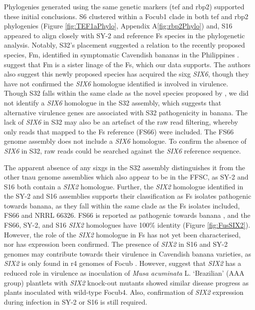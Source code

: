 Phylogenies generated using the same genetic markers (\ac{tef} and \ac{rbp2}) supported these initial conclusions. S6 clustered within a \ac{Focub1} clade in both \acs{tef} and \ac{rbp2} phylogenies (Figure \ref{fig:TEF1aPhylo}, Appendix A\ref{fig:rbp2Phylo}) and, S16 appeared to align closely with SY-2 and reference \ac{Fs} species in the phylogenetic analysis. Notably, S32's placement suggested a relation to the recently proposed species, \acf{Fm}, identified in symptomatic Cavendish bananas in the Philippines \parencite{Nozawa2023}. \textcite{Nozawa2023} suggest that \ac{Fm} is a sister linage of the \ac{Fs}, which our data supports. The authors also suggest this newly proposed species has acquired the \ac{sixg} \textit{SIX6}, though they have not confirmed the \textit{SIX6} homologue identified is involved in virulence. Though S32 falls within the same clade as the novel species proposed by \textcite{Nozawa2023}, we did not identify a \textit{SIX6} homologue in the S32 assembly, which suggests that alternative virulence genes are associated with S32 pathogenicity in banana. The lack of \textit{SIX6} in S32 may also be an artefact of the raw read filtering, whereby only reads that mapped to the \ac{Fs} reference (FS66) were included. The FS66 genome assembly does not include a \textit{SIX6} homologue. To confirm the absence of \textit{SIX6} in S32, raw reads could be searched against the \textit{SIX6} reference sequence. 

The apparent absence of any \acp{sixg} in the S32 assembly distinguishes it from the other \ac{tnau} genome assemblies which also appear to be in the \ac{FFSC}, as SY-2 and S16 both contain a \textit{SIX2} homologue. Further, the \textit{SIX2} homologue identified in the SY-2 and S16 assemblies supports their classification as \ac{Fs} isolates pathogenic towards banana, as they fall within the same clade as the \ac{Fs} isolates included, FS66 and NRRL 66326. FS66 is reported as pathogenic towards banana \parencite{Cui2021}, and the FS66, SY-2, and S16 \textit{SIX2} homologues have 100\% identity (Figure \ref{fig:FusSIX2}). However, the role of the \textit{SIX2} homologue in \ac{Fs} has not yet been characterised, nor has expression been confirmed. The presence of \textit{SIX2} in S16 and SY-2 genomes may contribute towards their virulence in Cavendish banana varieties, as \textit{SIX2} is only found in \ac{r4} genomes of \ac{Focub} \parencite{Czislowski2018}. However, \textcite{An2019} suggest that \textit{SIX2} has a reduced role in virulence as inoculation of \textit{Musa acuminata} L. ‘Brazilian’ (AAA group) plantlets with \textit{SIX2} knock-out mutants showed similar disease progress as plants inoculated with wild-type \ac{Focub4}. Also, confirmation of \textit{SIX2} expression during infection in SY-2 or S16 is still required. 

